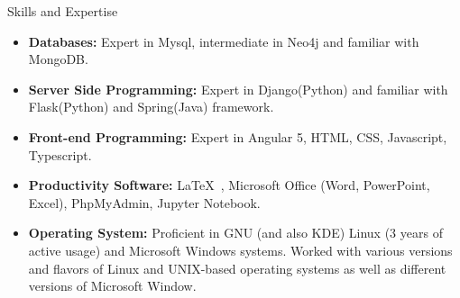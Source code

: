 \documentclass[]{mcdowellcv}
\begin{document}
\begin{cvsection}{Skills and Expertise}
\begin{itemize}
            \item \textbf{Databases:} Expert in Mysql, intermediate in Neo4j and familiar with MongoDB.
            \item \textbf{Server Side Programming:} Expert in Django(Python) and familiar with Flask(Python) and Spring(Java) framework.
            \item \textbf{Front-end Programming:} Expert in Angular 5, HTML, CSS, Javascript, Typescript.
    	    \item \textbf{Productivity Software:} \LaTeX\ ,  Microsoft Office (Word, PowerPoint, Excel),  PhpMyAdmin, Jupyter Notebook.
    	    \item \textbf{Operating System:} Proficient in GNU (and also KDE) Linux (3 years of active usage) and Microsoft Windows systems. Worked with various versions and flavors of Linux and UNIX-based operating systems as well as different versions of Microsoft Window.
    	    \end{itemize}
    
    \end{cvsection}
    
\end{document}
